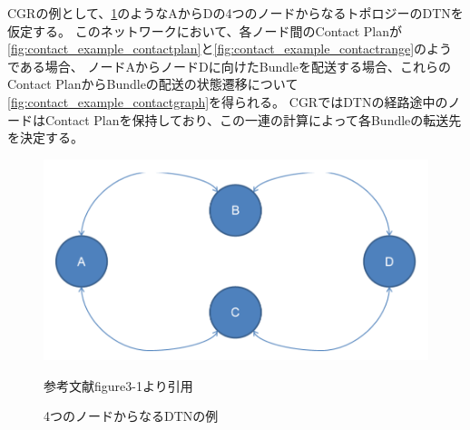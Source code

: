 CGRの例として、\ref{fig:contact_example_topology}のようなAからDの4つのノードからなるトポロジーのDTNを仮定する。
このネットワークにおいて、各ノード間のContact Planが\ref{fig:contact_example_contactplan}と\ref{fig:contact_example_contactrange}のようである場合、
ノードAからノードDに向けたBundleを配送する場合、これらのContact PlanからBundleの配送の状態遷移について\ref{fig:contact_example_contactgraph}を得られる。
CGRではDTNの経路途中のノードはContact Planを保持しており、この一連の計算によって各Bundleの転送先を決定する。
\begin{figure}[tbh]
    \centering
    \includegraphics[width=0.5\textheight]{img/contact_example_topology.pdf}
    \caption{4つのノードからなるDTNの例}
    \label{fig:contact_example_topology}
    \begin{minipage}{\textwidth}
        \centering
        \vspace{3mm}
        参考文献\cite{schedule_aware_bundle_routing}figure3-1より引用
    \end{minipage}
\end{figure}
